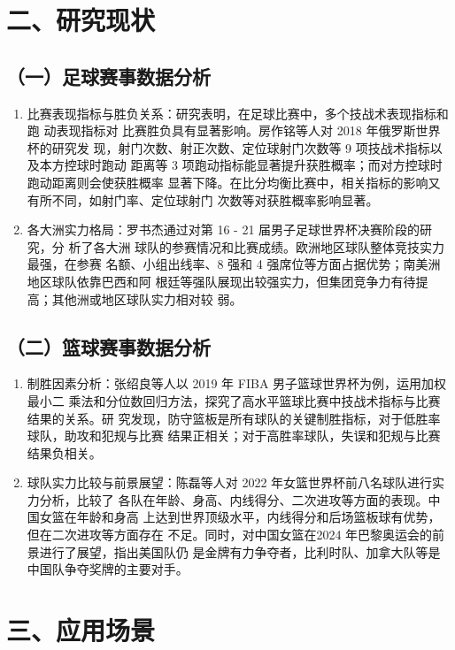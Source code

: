 \documentclass[UTF8]{ctexart}
\begin{document}
	\section*{二、研究现状}
	
	\subsection*{（一）足球赛事数据分析}
	\begin{enumerate}
		\item 比赛表现指标与胜负关系：研究表明，在足球比赛中，多个技战术表现指标和跑
		动表现指标对 比赛胜负具有显著影响。房作铭等人对 2018 年俄罗斯世界杯的研究发
		现，射门次数、射正次数、定位球射门次数等 9 项技战术指标以及本方控球时跑动
		距离等 3 项跑动指标能显著提升获胜概率；而对方控球时跑动距离则会使获胜概率
		显著下降。在比分均衡比赛中，相关指标的影响又有所不同，如射门率、定位球射门
		次数等对获胜概率影响显著。
		\item 各大洲实力格局：罗书杰通过对第 16 - 21 届男子足球世界杯决赛阶段的研究，分
		析了各大洲 球队的参赛情况和比赛成绩。欧洲地区球队整体竞技实力最强，在参赛
		名额、小组出线率、8 强和 4 强席位等方面占据优势；南美洲地区球队依靠巴西和阿
		根廷等强队展现出较强实力，但集团竞争力有待提高；其他洲或地区球队实力相对较
		弱。
	\end{enumerate}
	
	\subsection*{（二）篮球赛事数据分析}
	\begin{enumerate}
		\item 制胜因素分析：张绍良等人以 2019 年 FIBA 男子篮球世界杯为例，运用加权最小二
		乘法和分位数回归方法，探究了高水平篮球比赛中技战术指标与比赛结果的关系。研
		究发现，防守篮板是所有球队的关键制胜指标，对于低胜率球队，助攻和犯规与比赛
		结果正相关；对于高胜率球队，失误和犯规与比赛结果负相关。
		\item 球队实力比较与前景展望：陈磊等人对 2022 年女篮世界杯前八名球队进行实力分析，比较了
		各队在年龄、身高、内线得分、二次进攻等方面的表现。中国女篮在年龄和身高
		上达到世界顶级水平，内线得分和后场篮板球有优势，但在二次进攻等方面存在
		不足。同时，对中国女篮在2024 年巴黎奥运会的前景进行了展望，指出美国队仍
		是金牌有力争夺者，比利时队、加拿大队等是中国队争夺奖牌的主要对手。
	\end{enumerate}
	
	\section*{三、应用场景}
	
\end{document}
